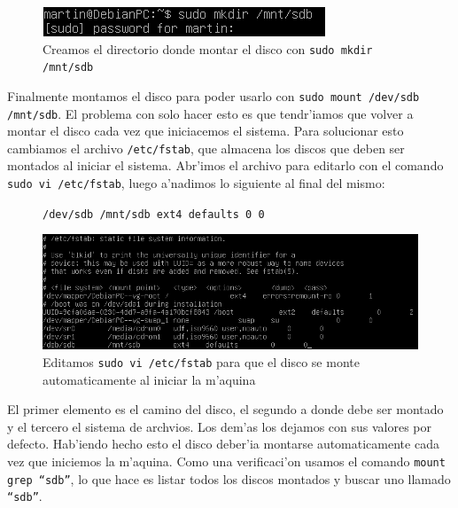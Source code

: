\documentclass[11pt]{article}
\newcommand{\codetext}[2]{\large\texttt{\textcolor{#1}{#2}}}
\begin{document}
		\begin{figure}[H]
    			\centering
    			\includegraphics[scale=0.75]{Images/rsync/rsync_disk_mount.PNG}
    			\caption{Creamos el directorio donde montar el disco con \texttt{sudo mkdir /mnt/sdb}}
    			\label{fig:rsync_disk_mount}
		\end{figure}

		Finalmente montamos el disco para poder usarlo con \texttt{sudo mount /dev/sdb /mnt/sdb}. El problema con solo hacer esto es que tendr'iamos que volver a montar el disco cada vez que iniciacemos el sistema. Para solucionar esto cambiamos el archivo \texttt{/etc/fstab}, que almacena los discos que deben ser montados al iniciar el sistema. Abr'imos el archivo para editarlo con el comando \texttt{sudo vi /etc/fstab}, luego a'nadimos lo siguiente al final del mismo:

		\begin{figure}[H]
			\centering
			\begin{code-box}
				\codetext{dark-gray}{/dev/sdb /mnt/sdb ext4 defaults 0 0}
			\end{code-box}
		\end{figure}
		
		\begin{figure}[H]
    			\centering
    			\includegraphics[scale=0.65]{Images/rsync/rsync_disk_automount.PNG}
    			\caption{Editamos \texttt{sudo vi /etc/fstab} para que el disco se monte automaticamente al iniciar la m'aquina}
    			\label{fig:rsync_disk_automount}
		\end{figure}

		El primer elemento es el camino del disco, el segundo a donde debe ser montado y el tercero el sistema de archvios. Los dem'as los dejamos con sus valores por defecto. Hab'iendo hecho esto el disco deber'ia montarse automaticamente cada vez que iniciemos la m'aquina. Como una verificaci'on usamos el comando \texttt{mount \textbar\/ grep ``sdb''}, lo que hace es listar todos los discos montados y buscar uno llamado \texttt{``sdb''}.
\end{document}
